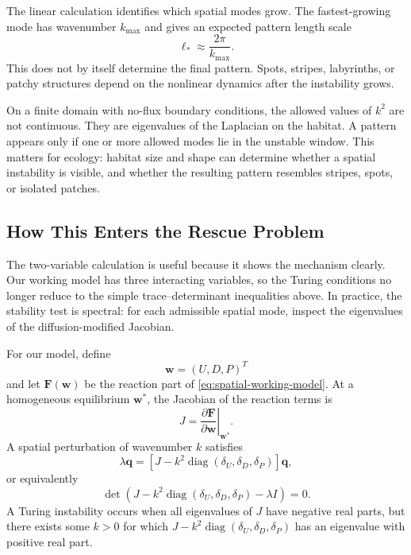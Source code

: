 \documentclass[12pt,letterpaper]{article}
\numberwithin{equation}{section}
\begin{document}
The linear calculation identifies which spatial modes grow. The fastest-growing mode
has wavenumber $k_{\max}$ and gives an expected pattern length scale
\begin{equation}
    \ell_*\approx \frac{2\pi}{k_{\max}}.
\end{equation}
This does not by itself determine the final pattern. Spots, stripes, labyrinths, or
patchy structures depend on the nonlinear dynamics after the instability grows.

On a finite domain with no-flux boundary conditions, the allowed values of $k^2$ are
not continuous. They are eigenvalues of the Laplacian on the habitat. A pattern appears
only if one or more allowed modes lie in the unstable window. This matters for
ecology: habitat size and shape can determine whether a spatial instability is visible,
and whether the resulting pattern resembles stripes, spots, or isolated patches.

\subsection{How This Enters the Rescue Problem}

The two-variable calculation is useful because it shows the mechanism clearly. Our
working model has three interacting variables, so the Turing conditions no longer
reduce to the simple trace--determinant inequalities above. In practice, the stability
test is spectral: for each admissible spatial mode, inspect the eigenvalues of the
diffusion-modified Jacobian.

For our model, define
\begin{equation}
    \mathbf{w}=(U,D,P)^T
\end{equation}
and let $\mathbf{F}(\mathbf{w})$ be the reaction part of
\eqref{eq:spatial-working-model}.
At a homogeneous equilibrium $\mathbf{w}^*$, the Jacobian of the reaction terms is
\begin{equation}
    J=\left.\frac{\partial\mathbf{F}}{\partial\mathbf{w}}\right|_{\mathbf{w}^*}.
\end{equation}
A spatial perturbation of wavenumber $k$ satisfies
\begin{equation}
    \lambda\mathbf{q}
    =
    \left[
    J-k^2\operatorname{diag}(\delta_U,\delta_D,\delta_P)
    \right]\mathbf{q},
\end{equation}
or equivalently
\begin{equation}
    \det\left(
    J-k^2\operatorname{diag}(\delta_U,\delta_D,\delta_P)-\lambda I
    \right)=0.
\end{equation}
A Turing instability occurs when all eigenvalues of $J$ have negative real parts, but
there exists some $k>0$ for which
$J-k^2\operatorname{diag}(\delta_U,\delta_D,\delta_P)$ has an eigenvalue with positive
real part.
\end{document}

